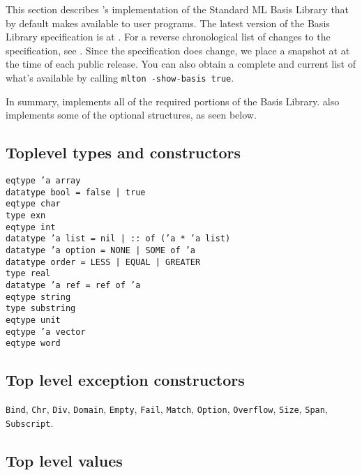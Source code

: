 %
This section describes {\mlton}'s implementation of the Standard ML
Basis Library that by default {\mlton} makes available to user
programs.  The latest version of the Basis Library specification is at
.  For a reverse chronological
list of changes to the specification, see
.  Since the
specification does change, we place a snapshot at
 at the time of each {\mlton} public release.
You can also obtain a complete and current list of what's available by
calling {\tt mlton -show-basis true}.

In summary, {\mlton} implements all of the required portions of the
Basis Library.  {\mlton} also implements some of the optional
structures, as seen below.
%
\subsection{Toplevel types and constructors}
{
\tt eqtype 'a array\\
\tt datatype bool = false | true\\
\tt eqtype char\\
\tt type exn\\
\tt eqtype int\\
\tt datatype 'a list = nil | :: of ('a * 'a list)\\
\tt datatype 'a option = NONE | SOME of 'a\\
\tt datatype order = LESS | EQUAL | GREATER\\
\tt type real\\
\tt datatype 'a ref = ref of 'a\\
\tt eqtype string\\
\tt type substring\\
\tt eqtype unit\\
\tt eqtype 'a vector\\
\tt eqtype word\\
}
%
\subsection{Top level exception constructors}
{\tt Bind},
{\tt Chr},
{\tt Div},
{\tt Domain},
{\tt Empty},
{\tt Fail},
{\tt Match},
{\tt Option},
{\tt Overflow},
{\tt Size},
{\tt Span},
{\tt Subscript}.
%
\subsection{Top level values}

